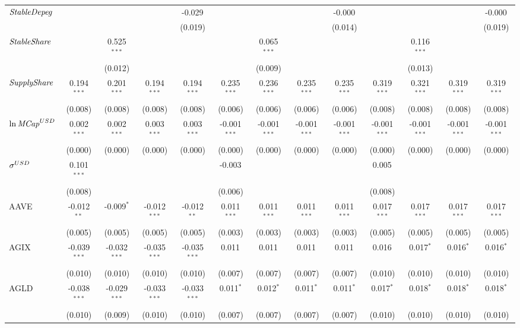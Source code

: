 \begin{table}[!htbp]
\begin{tabular}{@{\extracolsep{5pt}}lcccccccccccc}
 ${\it StableDepeg}$ & & & & -0.029$^{}$ & & & & -0.000$^{}$ & & & & -0.000$^{}$ \\
  & & & & (0.019) & & & & (0.014) & & & & (0.019) \\
 ${\it StableShare}$ & & 0.525$^{***}$ & & & & 0.065$^{***}$ & & & & 0.116$^{***}$ & & \\
  & & (0.012) & & & & (0.009) & & & & (0.013) & & \\
 ${\it SupplyShare}$ & 0.194$^{***}$ & 0.201$^{***}$ & 0.194$^{***}$ & 0.194$^{***}$ & 0.235$^{***}$ & 0.236$^{***}$ & 0.235$^{***}$ & 0.235$^{***}$ & 0.319$^{***}$ & 0.321$^{***}$ & 0.319$^{***}$ & 0.319$^{***}$ \\
  & (0.008) & (0.008) & (0.008) & (0.008) & (0.006) & (0.006) & (0.006) & (0.006) & (0.008) & (0.008) & (0.008) & (0.008) \\
 ${\it \ln MCap}^{USD}$ & 0.002$^{***}$ & 0.002$^{***}$ & 0.003$^{***}$ & 0.003$^{***}$ & -0.001$^{***}$ & -0.001$^{***}$ & -0.001$^{***}$ & -0.001$^{***}$ & -0.001$^{***}$ & -0.001$^{***}$ & -0.001$^{***}$ & -0.001$^{***}$ \\
  & (0.000) & (0.000) & (0.000) & (0.000) & (0.000) & (0.000) & (0.000) & (0.000) & (0.000) & (0.000) & (0.000) & (0.000) \\
 ${\it \sigma}^{USD}$ & 0.101$^{***}$ & & & & -0.003$^{}$ & & & & 0.005$^{}$ & & & \\
  & (0.008) & & & & (0.006) & & & & (0.008) & & & \\
 AAVE & -0.012$^{**}$ & -0.009$^{*}$ & -0.012$^{***}$ & -0.012$^{**}$ & 0.011$^{***}$ & 0.011$^{***}$ & 0.011$^{***}$ & 0.011$^{***}$ & 0.017$^{***}$ & 0.017$^{***}$ & 0.017$^{***}$ & 0.017$^{***}$ \\
  & (0.005) & (0.005) & (0.005) & (0.005) & (0.003) & (0.003) & (0.003) & (0.003) & (0.005) & (0.005) & (0.005) & (0.005) \\
 AGIX & -0.039$^{***}$ & -0.032$^{***}$ & -0.035$^{***}$ & -0.035$^{***}$ & 0.011$^{}$ & 0.011$^{}$ & 0.011$^{}$ & 0.011$^{}$ & 0.016$^{}$ & 0.017$^{*}$ & 0.016$^{*}$ & 0.016$^{*}$ \\
  & (0.010) & (0.010) & (0.010) & (0.010) & (0.007) & (0.007) & (0.007) & (0.007) & (0.010) & (0.010) & (0.010) & (0.010) \\
 AGLD & -0.038$^{***}$ & -0.029$^{***}$ & -0.033$^{***}$ & -0.033$^{***}$ & 0.011$^{*}$ & 0.012$^{*}$ & 0.011$^{*}$ & 0.011$^{*}$ & 0.017$^{*}$ & 0.018$^{*}$ & 0.018$^{*}$ & 0.018$^{*}$ \\
  & (0.010) & (0.009) & (0.010) & (0.010) & (0.007) & (0.007) & (0.007) & (0.007) & (0.010) & (0.010) & (0.010) & (0.010) \\

\end{tabular}
\end{table}
